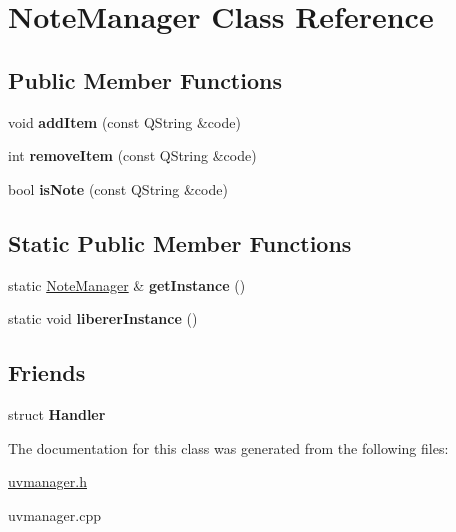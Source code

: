 \hypertarget{class_note_manager}{\section{Note\+Manager Class Reference}
\label{class_note_manager}
}
\subsection*{Public Member Functions}
\begin{DoxyCompactItemize}
\item 
\hypertarget{class_note_manager_a43de96f6bc9295fd889f90e37aff4381}{void {\bfseries add\+Item} (const Q\+String \&code)}\label{class_note_manager_a43de96f6bc9295fd889f90e37aff4381}

\item 
\hypertarget{class_note_manager_a16d9795a6d44f980e918fecc76d686db}{int {\bfseries remove\+Item} (const Q\+String \&code)}\label{class_note_manager_a16d9795a6d44f980e918fecc76d686db}

\item 
\hypertarget{class_note_manager_aada7f7636665af83c08c5d6bb7a04888}{bool {\bfseries is\+Note} (const Q\+String \&code)}\label{class_note_manager_aada7f7636665af83c08c5d6bb7a04888}

\end{DoxyCompactItemize}
\subsection*{Static Public Member Functions}
\begin{DoxyCompactItemize}
\item 
\hypertarget{class_note_manager_a66d09f446993085eee7b322ec8b289f1}{static \hyperlink{class_note_manager}{Note\+Manager} \& {\bfseries get\+Instance} ()}\label{class_note_manager_a66d09f446993085eee7b322ec8b289f1}

\item 
\hypertarget{class_note_manager_a0ea94a35039be554d8398e01ff5476d6}{static void {\bfseries liberer\+Instance} ()}\label{class_note_manager_a0ea94a35039be554d8398e01ff5476d6}

\end{DoxyCompactItemize}
\subsection*{Friends}
\begin{DoxyCompactItemize}
\item 
\hypertarget{class_note_manager_a7ab9a1e3d1a8ab9a8badf544bf7e0197}{struct {\bfseries Handler}}\label{class_note_manager_a7ab9a1e3d1a8ab9a8badf544bf7e0197}

\end{DoxyCompactItemize}


The documentation for this class was generated from the following files\+:\begin{DoxyCompactItemize}
\item 
\hyperlink{uvmanager_8h}{uvmanager.\+h}\item 
uvmanager.\+cpp\end{DoxyCompactItemize}
